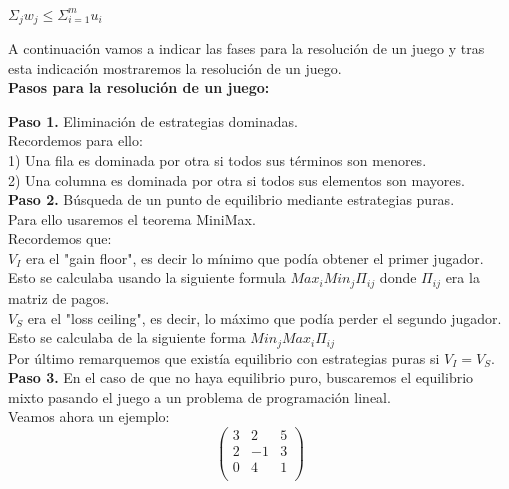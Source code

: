 \documentclass[10pt,a4paper]{book}
\begin{document}
\begin{center}

$\Sigma_j w_j \leq \Sigma^m_{i=1}u_i$

\end{center}

A continuación vamos a indicar las fases para la resolución de un juego y tras esta indicación mostraremos la resolución de un juego.\\

\textbf{Pasos para la resolución de un juego:}

\textbf{Paso 1.} Eliminación de estrategias dominadas.\\
Recordemos para ello:\\

1) Una fila es dominada por otra si todos sus términos son menores.\\
2) Una columna es dominada por otra si todos sus elementos son mayores.\\

\textbf{Paso 2.} Búsqueda de un punto de equilibrio mediante estrategias puras.\\

Para ello usaremos el teorema MiniMax.\\
Recordemos que:\\
$V_I$ era el "gain floor", es decir lo mínimo que podía obtener el primer jugador. Esto se calculaba usando la siguiente formula $Max_iMin_j \Pi_{ij}$ donde $\Pi_{ij}$ era la matriz de pagos.\\

$V_S$ era el "loss ceiling", es decir, lo máximo que podía perder el segundo jugador. Esto se calculaba de la siguiente forma $Min_jMax_i \Pi_{ij}$\\

Por último remarquemos que existía equilibrio con estrategias puras si $V_I=V_S$.\\

\textbf{Paso 3.} En el caso de que no haya equilibrio puro, buscaremos el equilibrio mixto pasando el juego a un problema de programación lineal.\\


Veamos ahora un ejemplo:\\

$$
\left(
\begin{array}{cccc}
3 & 2 & 5 \\
2 & -1 & 3\\
0 & 4 & 1\\
\end{array}
\right)
$$
\end{document}
